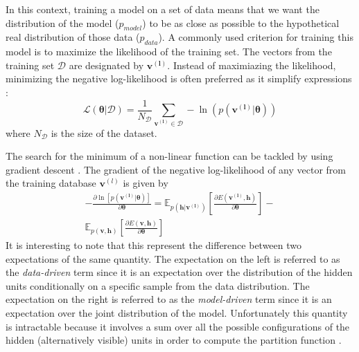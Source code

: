 \documentclass[letterpaper]{article}
\begin{document}
In this context, training a model on a set of data means that we want the distribution of the model ($p_{model}$) to be as close as possible to the hypothetical real distribution of those data ($p_{data}$). A commonly used criterion for training this model is to maximize the likelihood of the training set. The vectors from the training set $\mathcal{D}$ are designated by $\bm{v^{(l)}}$.
Instead of maximiazing the likelihood, minimizing the negative log-likelihood is often preferred as it simplify expressions :
\begin{equation}
\mathcal{L(\bm{\theta}|\mathcal{D})}  = \frac{1}{N_{\mathcal{D}}} \sum_{\bm{v^{(l)}} \in \mathcal{D}} - \ln \left( p(\bm{v^{(l)}}|\bm{\theta})\right)
\end{equation}
where $N_{\mathcal{D}}$ is the size of the dataset. 

The search for the minimum of a non-linear function can be tackled by using gradient descent \cite{bottou2010large}. The gradient of the negative log-likelihood of any vector from the training database $\bm{v}^{(l)}$ is given by
\begin{equation}
\begin{split}
- \frac{\partial \ln \left[ p(\bm{v^{(l)}}|\bm{\theta})\right]}{\partial \bm{\theta}} 
= 
\mathbb{E}_{p(\bm{h}|\bm{v^{(l)}})} \left[ \frac{\partial E(\bm{v^{(l)}},\bm{h})}{\partial \bm{\theta}} \right] 
- \\
\mathbb{E}_{p(\bm{v} , \bm{h})} \left[ \frac{\partial E(\bm{v},\bm{h})}{\partial \bm{\theta}} \right]
\end{split}
\end{equation}
It is interesting to note that this represent the difference between two expectations of the same quantity. The expectation on the left is referred to as the \textit{data-driven} term since it is an expectation over the distribution of the hidden units conditionally on a specific sample from the data distribution. The expectation on the right is referred to as the \textit{model-driven} term since it is an expectation over the joint distribution of the model.
Unfortunately this quantity is intractable because it involves a sum over all the possible configurations of the hidden (alternatively visible) units in order to compute the partition function \cite{conf/ciarp/FischerI12}.
\end{document}
